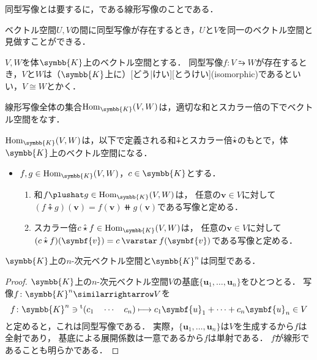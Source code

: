 \documentclass[../sotsu.tex]{subfiles}
\begin{document}
同型写像とは要するに，である線形写像のことである．

ベクトル空間$U, V$の間に同型写像が存在するとき，$U$と$V$を同一のベクトル空間と見做すことができる．

\begin{definition}[同型]
    \label{dfn:isomorphic}
    $V, W$を体$\symbb{K}$上のベクトル空間とする．
    同型写像$f \colon V \similarrightarrow W$が存在するとき，$V$と$W$は（$\symbb{K}$上に）[どう|けい][とうけい](isomorphic)であるといい，$V \cong W$とかく．
\end{definition}

線形写像全体の集合$\mathrm{Hom}_{\symbb{K}}(V, W)$は，適切な和とスカラー倍の下でベクトル空間をなす．

\begin{proposition}
    \label{thm:linear-map-space}
    $\mathrm{Hom}_{\symbb{K}}(V, W)$は，以下で定義される和$\plushat$とスカラー倍$\hat{\mathbin{\star}}$のもとで，体$\symbb{K}$上のベクトル空間になる\cite[\S 4.4]{saito-lin-2007}．
    \begin{itemize}
        \item $f, g \in \mathrm{Hom}_{\symbb{K}}(V, W)$，$c \in \symbb{K}$とする．
        \begin{enumerate}
            \item 和$f \plushat g \in \mathrm{Hom}_{\symbb{K}}(V, W)$は，
                任意の$\symbf{v} \in V$に対して$ ( f \plushat g )(\symbf{v}) = f(\symbf{v}) \doubleplus g(\symbf{v}) $である写像と定める．
            \item スカラー倍$c \mathbin{\hat{\scaprod}} f \in \mathrm{Hom}_{\symbb{K}}(V, W)$は，
                任意の$\symbf{v} \in V$に対して$ ( c \mathbin{\hat{\scaprod}} f )(\symbf{v}) = c \scaprodvar f(\symbf{v}) $である写像と定める．
        \end{enumerate}
    \end{itemize}
\end{proposition}



\begin{proposition}
    $\symbb{K}$上の$n$-次元ベクトル空間と$\symbb{K}^n$は同型である\cite{saito-lin-2007}．
\end{proposition}

\begin{proof}
    $\symbb{K}$上の$n$-次元ベクトル空間$V$の基底$\{\symbf{u}_1, \dots, \symbf{u}_n\}$をひとつとる．
    写像$f \colon \symbb{K}^n \similarrightarrow V$を
    \begin{equation*}
        f \colon \symbb{K}^n \ni \tp{(c_1 \quad \dotsm \quad c_n)}
            \longmapsto
            c_1 \symbf{u}_1 + \dots + c_n \symbf{u}_n \in V
    \end{equation*}
    と定めると，これは同型写像である．
    実際，$\{\symbf{u}_1, \dots, \symbf{u}_n\}$は$V$を生成するから$f$は全射であり，
    基底による展開係数は一意であるから$f$は単射である．
    $f$が線形であることも明らかである．
\end{proof}
\end{document}
